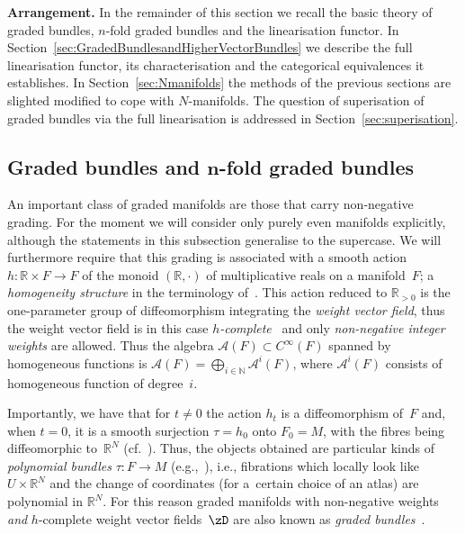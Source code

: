 \documentclass[10pt,a4paper]{amsart}
\newcommand{\R}{{\mathbb R}}
\newcommand{\ti}{\times}
\numberwithin{equation}{section}
\begin{document}
\textbf{Arrangement.} In the remainder of this section we recall the basic theory of graded bundles, $n$-fold graded bundles and the linearisation functor. In Section~\ref{sec:GradedBundlesandHigherVectorBundles} we describe the full linearisation functor, its characterisation and the categorical equivalences it establishes. In Section~\ref{sec:Nmanifolds} the methods of the previous sections are slighted modif\/ied to cope with $N$-manifolds. The question of superisation of graded bundles via the full linearisation is addressed in Section~\ref{sec:superisation}.

\subsection[Graded bundles and $n$-fold graded bundles]{Graded bundles and $\boldsymbol{n}$-fold graded bundles}

An important class of graded manifolds are those that carry non-negative grading. For the moment we will consider only purely even manifolds explicitly, although the statements in this subsection generalise to the supercase. We will furthermore require that this grading is associated with a smooth action $h\colon \R\ti F\to F$ of the monoid $(\R,\cdot)$ of multiplicative reals on a mani\-fold~$F$; a \emph{homogeneity structure} in the terminology of~\cite{JG_MR_higher_vb}. This action reduced to $\R_{>0}$ is the one-parameter group of dif\/feomorphism integrating the \emph{weight vector field}, thus the weight vector f\/ield is in this case \emph{$h$-complete}~\cite{Grabowski2013} and only \emph{non-negative integer weights} are allowed. Thus the algebra $\mathcal{A}(F)\subset C^\infty(F)$ spanned by homogeneous functions is $\mathcal{A}(F) = \bigoplus_{i \in \mathbb{N}}\mathcal{A}^{i}(F)$, where $\mathcal{A}^{i}(F)$ consists of homogeneous function of degree~$i$.

Importantly, we have that for $t \neq 0$ the action $h_{t}$ is a dif\/feomorphism of~$F$ and, when $t=0$, it is a smooth surjection $\tau=h_0$ onto $F_{0}=M$, with the f\/ibres being dif\/feomorphic to~$\mathbb{R}^{N}$ (cf.~\cite{JG_MR_higher_vb}). Thus, the objects obtained are particular kinds of \emph{polynomial bundles} $\tau\colon F\to M$ (e.g.,~\cite{Bertram:2014, Voronov:2010_highr_alg}), i.e., f\/ibrations which locally look like $U\times\R^N$ and the change of coordinates (for a~certain choice of an atlas) are polynomial in $\R^N$. For this reason graded manifolds with non-negative weights \emph{and} $h$-complete weight vector f\/ields~$\zD$ are also known as \emph{graded bundles}~\cite{JG_MR_higher_vb}.
\end{document}
